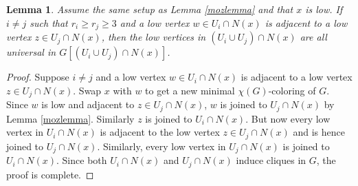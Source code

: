 \documentclass[12pt]{amsart}
\theoremstyle{plain}
\newtheorem{lem}[thm]{Lemma}
\theoremstyle{definition}
\theoremstyle{remark}
\begin{document}
\begin{lem}\label{JoinedLows}
Assume the same setup as Lemma \ref{mozlemma} and that $x$ is low. If $i \neq j$ such that $r_i \geq r_j \geq 3$ and a low vertex $w \in U_i \cap N(x)$ is adjacent to a low vertex $z \in U_j \cap N(x)$, then the low vertices in $(U_i \cup U_j) \cap N(x)$ are all universal in
$G[(U_i \cup U_j) \cap N(x)]$. 
\end{lem}
\begin{proof}
Suppose $i \neq j$ and a low vertex $w \in U_i \cap N(x)$ is adjacent to a low vertex $z \in U_j \cap N(x)$.  Swap $x$ with $w$ to get a new minimal $\chi(G)$-coloring of $G$.  Since $w$ is low and adjacent to $z \in U_j \cap N(x)$, $w$ is joined to $U_j \cap N(x)$ by Lemma \ref{mozlemma}.  Similarly $z$ is joined to $U_i \cap N(x)$.  But now every low vertex in $U_i \cap N(x)$ is adjacent to the low vertex $z \in U_j \cap N(x)$ and is hence joined to $U_j \cap N(x)$. Similarly, every low vertex in $U_j \cap N(x)$ is joined to $U_i \cap N(x)$.  Since both $U_i \cap N(x)$ and $U_j \cap N(x)$ induce cliques in $G$, the proof is complete.
\end{proof}
\end{document}
